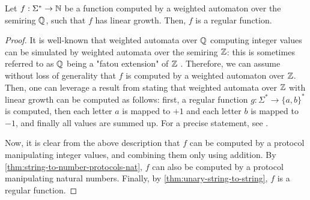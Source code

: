 \begin{corollary}
  \label{cor:weighted-automata-nat-regular}
  Let $f : \Sigma^* \to {\mathbb N}$ be a function computed by a weighted automaton
  over the semiring ${\mathbb Q}$, such that $f$ has linear growth. Then, $f$ is a regular function.
\end{corollary}
\begin{proof}
  It is well-known that weighted automata over ${\mathbb Q}$ computing integer values
  can be simulated by weighted automata over the semiring ${\mathbb Z}$: this is
  sometimes referred to as ${\mathbb Q}$ being a "fatou extension" of ${\mathbb Z}$
  \cite[p. 110]{BerstelReutenauer08}.
  Therefore, we can assume without loss of generality that $f$ is computed by
  a weighted automaton over ${\mathbb Z}$. Then, one can leverage a 
  result from \cite{Zpolyreg23} stating that weighted automata over ${\mathbb Z}$
  with linear growth can be computed as follows: first, a regular function $g : \Sigma^* \to
  \{a,b\}^*$ is computed, then each letter $a$ is mapped to $+1$ and each 
  letter $b$ is mapped to $-1$, and finally all values are summed up. 
  For a precise statement, see \cite[Proposition II.13, Theorem III.3]{Zpolyreg23}.

  Now, it is clear from the above description that $f$ can be computed by a protocol
  manipulating integer values, and combining them only using addition. By
  \cref{thm:string-to-number-protocols-nat}, $f$ can also be computed by a
  protocol manipulating natural numbers. Finally, by \cref{thm:unary-string-to-string},
  $f$ is a regular function.
\end{proof}
